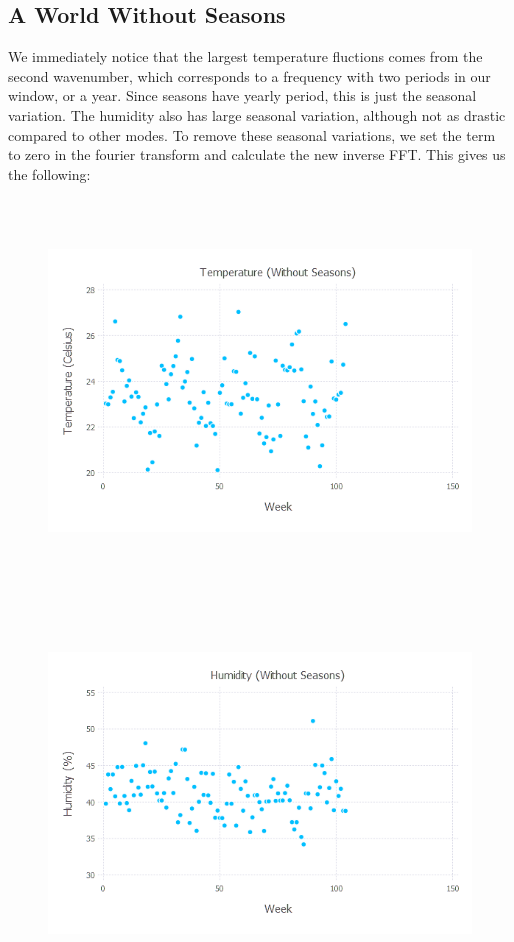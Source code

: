 \documentclass{article}
\begin{document}
\subsection{A World Without Seasons}

We immediately notice that the largest temperature fluctions comes from the second wavenumber, which corresponds to a frequency with two periods in our window, or a year. Since seasons have yearly period, this is just the seasonal variation. The humidity also has large seasonal variation, although not as drastic compared to other modes. To remove these seasonal variations, we set the term to zero in the fourier transform and calculate the new inverse FFT. This gives us the following:

\begin{figure}[H]
	\includegraphics[width=6in,height=4in]{"temp_ns"}
\end{figure}
\begin{figure}[H]
	\includegraphics[width=6in,height=4in]{"hum_ns"}
\end{figure}
\end{document}
